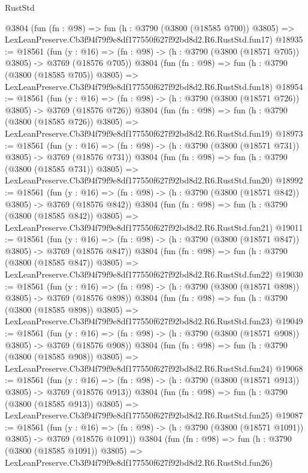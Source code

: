 \begin{lexlean}{RustStd}
\begin{coremodule}
    @3804
    (fun (fn : @98) =>
    fun (h : @3790 (@3800 (@18585 @700)) @3805) =>
    LexLeanPreserve.Cb3f94f79f9e8df177550f627f92bd8d2.R6.RustStd.fun17)
@18935 := @18561
    (fun (y : @16) => (fn : @98) -> (h : @3790 (@3800 (@18571 @705)) @3805) -> @3769 (@18576 @705))
    @3804
    (fun (fn : @98) =>
    fun (h : @3790 (@3800 (@18585 @705)) @3805) =>
    LexLeanPreserve.Cb3f94f79f9e8df177550f627f92bd8d2.R6.RustStd.fun18)
@18954 := @18561
    (fun (y : @16) => (fn : @98) -> (h : @3790 (@3800 (@18571 @726)) @3805) -> @3769 (@18576 @726))
    @3804
    (fun (fn : @98) =>
    fun (h : @3790 (@3800 (@18585 @726)) @3805) =>
    LexLeanPreserve.Cb3f94f79f9e8df177550f627f92bd8d2.R6.RustStd.fun19)
@18973 := @18561
    (fun (y : @16) => (fn : @98) -> (h : @3790 (@3800 (@18571 @731)) @3805) -> @3769 (@18576 @731))
    @3804
    (fun (fn : @98) =>
    fun (h : @3790 (@3800 (@18585 @731)) @3805) =>
    LexLeanPreserve.Cb3f94f79f9e8df177550f627f92bd8d2.R6.RustStd.fun20)
@18992 := @18561
    (fun (y : @16) => (fn : @98) -> (h : @3790 (@3800 (@18571 @842)) @3805) -> @3769 (@18576 @842))
    @3804
    (fun (fn : @98) =>
    fun (h : @3790 (@3800 (@18585 @842)) @3805) =>
    LexLeanPreserve.Cb3f94f79f9e8df177550f627f92bd8d2.R6.RustStd.fun21)
@19011 := @18561
    (fun (y : @16) => (fn : @98) -> (h : @3790 (@3800 (@18571 @847)) @3805) -> @3769 (@18576 @847))
    @3804
    (fun (fn : @98) =>
    fun (h : @3790 (@3800 (@18585 @847)) @3805) =>
    LexLeanPreserve.Cb3f94f79f9e8df177550f627f92bd8d2.R6.RustStd.fun22)
@19030 := @18561
    (fun (y : @16) => (fn : @98) -> (h : @3790 (@3800 (@18571 @898)) @3805) -> @3769 (@18576 @898))
    @3804
    (fun (fn : @98) =>
    fun (h : @3790 (@3800 (@18585 @898)) @3805) =>
    LexLeanPreserve.Cb3f94f79f9e8df177550f627f92bd8d2.R6.RustStd.fun23)
@19049 := @18561
    (fun (y : @16) => (fn : @98) -> (h : @3790 (@3800 (@18571 @908)) @3805) -> @3769 (@18576 @908))
    @3804
    (fun (fn : @98) =>
    fun (h : @3790 (@3800 (@18585 @908)) @3805) =>
    LexLeanPreserve.Cb3f94f79f9e8df177550f627f92bd8d2.R6.RustStd.fun24)
@19068 := @18561
    (fun (y : @16) => (fn : @98) -> (h : @3790 (@3800 (@18571 @913)) @3805) -> @3769 (@18576 @913))
    @3804
    (fun (fn : @98) =>
    fun (h : @3790 (@3800 (@18585 @913)) @3805) =>
    LexLeanPreserve.Cb3f94f79f9e8df177550f627f92bd8d2.R6.RustStd.fun25)
@19087 := @18561
    (fun (y : @16) =>
    (fn : @98) -> (h : @3790 (@3800 (@18571 @1091)) @3805) -> @3769 (@18576 @1091))
    @3804
    (fun (fn : @98) =>
    fun (h : @3790 (@3800 (@18585 @1091)) @3805) =>
    LexLeanPreserve.Cb3f94f79f9e8df177550f627f92bd8d2.R6.RustStd.fun26)

\end{coremodule}
\end{lexlean}
